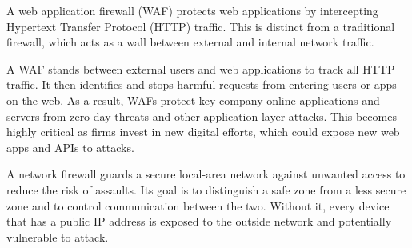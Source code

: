 A web application firewall (WAF) protects web applications by intercepting Hypertext Transfer Protocol (HTTP) traffic. This is distinct from a traditional firewall, which acts as a wall between external and internal network traffic.

A WAF stands between external users and web applications to track all HTTP traffic. It then identifies and stops harmful requests from entering users or apps on the web. As a result, WAFs protect key company online applications and servers from zero-day threats and other application-layer attacks. This becomes highly critical as firms invest in new digital efforts, which could expose new web apps and APIs to attacks.

A network firewall guards a secure local-area network against unwanted access to reduce the risk of assaults. Its goal is to distinguish a safe zone from a less secure zone and to control communication between the two. Without it, every device that has a public IP address is exposed to the outside network and potentially vulnerable to attack.

